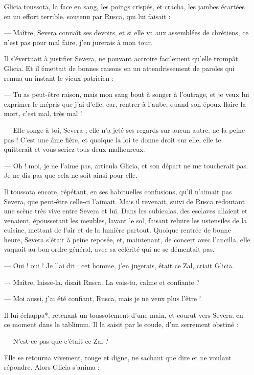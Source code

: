\documentclass[a4paper, 11pt, oneside, polutonikogreek, french]{article}
\begin{document}
Glicia toussota, la face en sang, les poings crispés, et cracha, les jambes écartées en un effort terrible, soutenu par Rusca, qui lui faisait :

--- Maître, Severa connaît ses devoirs, et si elle va aux assemblées de chrétiens, ce n'est pas pour mal faire, j'en jurerais à mon tour.

Il s'évertuait à justifier Severa, ne pouvant accroire facilement qu'elle trompât Glicia. Et il émettait de bonnes raisons en un attendrissement de paroles qui remua un instant le vieux patricien :

--- Tu as peut-être raison, mais mon sang bout à songer à l'outrage, et je veux lui exprimer le mépris que j'ai d'elle, car, rentrer à l'aube, quand son époux flaire la mort, c'est mal, très mal !

--- Elle songe à toi, Severa ; elle n'a jeté ses regards sur aucun autre, ne la peine pas ! C'est une âme fière, et quoique la loi te donne droit sur elle, elle te quitterait et vous seriez tous deux malheureux.

--- Oh ! moi, je ne l'aime pas, articula Glicia, et son départ ne me toucherait pas. Je ne dis pas que cela ne soit ainsi pour elle.

Il toussota encore, répétant, en ses habituelles confusions, qu'il n'aimait pas Severa, que peut-être celle-ci l'aimait. Mais il revenait, suivi de Rusca redoutant une scène très vive entre Severa et lui. Dans les cubiculas, des esclaves allaient et venaient, époussetant les meubles, lavant le sol, faisant reluire les ustensiles de la cuisine, mettant de l'air et de la lumière partout. Quoique rentrée de bonne heure, Severa s'était à peine reposée, et, maintenant, de concert avec l'ancilla, elle vaquait au bon ordre général, avec sa célérité qui ne se démentait pas.

--- Oui ! oui ! Je l'ai dit ; cet homme, j'en jugerais, était ce Zal, criait Glicia.

--- Maître, laisse-la, disait Rusca. La vois-tu, calme et confiante ?

--- Moi aussi, j'ai été confiant, Rusca, mais je ne veux plus l'être !

Il lui échappa*, retenant un toussotement d'une main, et courut vers Severa, en ce moment dans le tablinum. Il la saisit par le coude, d'un serrement obstiné :

--- N'est-ce pas que c'était ce Zal ?

Elle se retourna vivement, rouge et digne, ne sachant que dire et ne voulant répondre. Alors Glicia s'anima :
\end{document}
